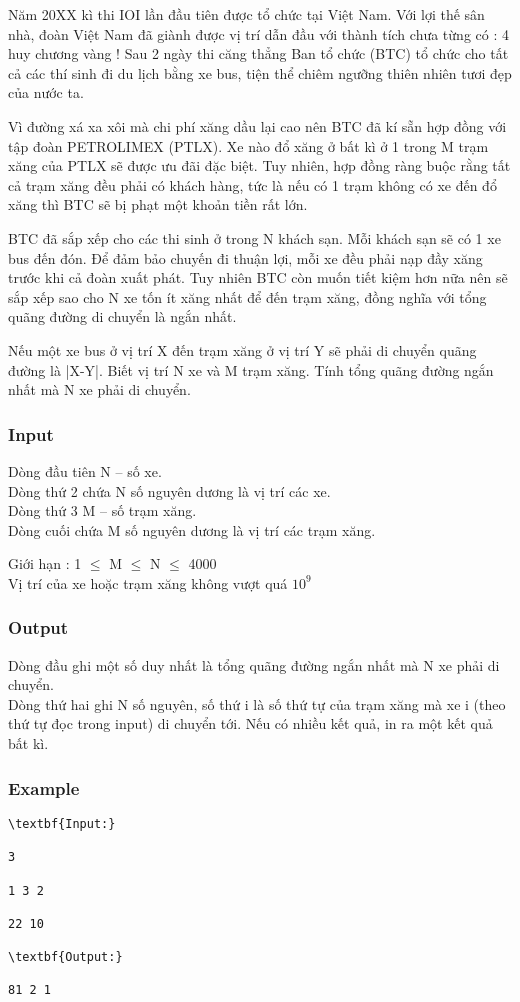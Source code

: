 



   Năm 20XX kì thi IOI lần đầu tiên được tổ chức tại Việt Nam. Với lợi thế sân nhà, đoàn Việt Nam đã giành được vị trí dẫn đầu với thành tích chưa từng có : 4 huy chương vàng ! Sau 2 ngày thi căng thẳng Ban tổ chức (BTC) tổ chức cho tất cả các thí sinh đi du lịch bằng xe bus, tiện thể chiêm ngưỡng thiên nhiên tươi đẹp của nước ta.  

   Vì đường xá xa xôi mà chi phí xăng dầu lại cao nên BTC đã kí sẵn hợp đồng với tập đoàn PETROLIMEX (PTLX). Xe nào đổ xăng ở bất kì ở 1 trong M trạm xăng của PTLX sẽ được ưu đãi đặc biệt. Tuy nhiên, hợp đồng ràng buộc rằng tất cả trạm xăng đều phải có khách hàng, tức là nếu có 1 trạm không có xe đến đổ xăng thì BTC sẽ bị phạt một khoản tiền rất lớn.  

   BTC đã sắp xếp cho các thi sinh ở trong N khách sạn. Mỗi khách sạn sẽ có 1 xe bus đến đón. Để đảm bảo chuyến đi thuận lợi, mỗi xe đều phải nạp đầy xăng trước khi cả đoàn xuất phát. Tuy nhiên BTC còn muốn tiết kiệm hơn nữa nên sẽ sắp xếp sao cho N xe tốn ít xăng nhất để đến trạm xăng, đồng nghĩa với tổng quãng đường di chuyển là ngắn nhất.  

   Nếu một xe bus ở vị trí X đến trạm xăng ở vị trí Y sẽ phải di chuyển quãng đường là |X-Y|. Biết vị trí N xe và M trạm xăng. Tính tổng quãng đường ngắn nhất mà N xe phải di chuyển.  

\subsubsection{   Input  }

   Dòng đầu tiên N – số xe.   
\\   Dòng thứ 2 chứa N số nguyên dương là vị trí các xe.   
\\   Dòng thứ 3 M – số trạm xăng.   
\\   Dòng cuối chứa M số nguyên dương là vị trí các trạm xăng.  

    Giới hạn :      1 $\le$  M  $\le$  N  $\le$  4000   
\\   Vị trí của xe hoặc trạm xăng không vượt quá $10^{9}$

\subsubsection{   Output  }

   Dòng đầu ghi một số duy nhất là tổng quãng đường ngắn nhất mà N xe phải di chuyển.   
\\   Dòng thứ hai ghi N số nguyên, số thứ i là số thứ tự của trạm xăng mà xe i (theo thứ tự đọc trong input) di chuyển tới. Nếu có nhiều kết quả, in ra một kết quả bất kì.  

\subsubsection{   Example  }
\begin{verbatim}
\textbf{Input:}

3

1 3 2

22 10

\textbf{Output:}

81 2 1 \end{verbatim}
